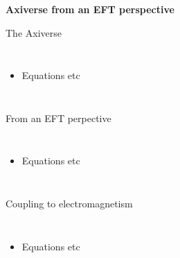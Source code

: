 \documentclass[aspectratio=1610, 9pt]{beamer}
\begin{document}
\begin{frame}[noframenumbering]
  \centering
  \Huge \textbf{\textcolor{tugreen}{Axiverse from an EFT perspective}}
\end{frame}

\begin{frame}{The Axiverse}
  \begin{columns}
    \column{\textwidth}
    \begin{itemize}
      \item Equations etc
    \end{itemize}
  \end{columns} 
\end{frame}

\begin{frame}{From an EFT perpective}
  \begin{columns}
    \column{\textwidth}
    \begin{itemize}
      \item Equations etc
    \end{itemize}
  \end{columns} 
\end{frame}

\begin{frame}{Coupling to electromagnetism}
  \begin{columns}
    \column{\textwidth}
    \begin{itemize}
      \item Equations etc
    \end{itemize}
  \end{columns} 
\end{frame}
\end{document}
